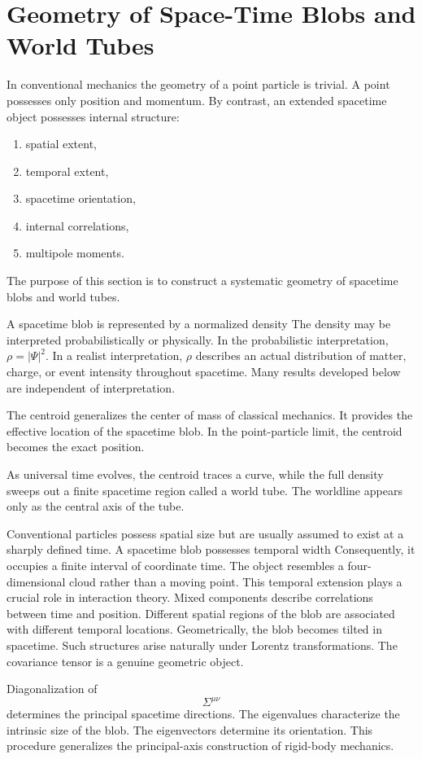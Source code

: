 \section{Geometry of Space-Time Blobs and World Tubes}
In conventional mechanics the geometry of a point particle is trivial. A
point possesses only position and momentum. By contrast, an extended
spacetime object possesses internal structure:
\begin{enumerate}
\item spatial extent,
\item temporal extent,
\item spacetime orientation,
\item internal correlations,
\item multipole moments.
\end{enumerate}
The purpose of this section is to construct a systematic geometry of 
spacetime blobs and world tubes.

A spacetime blob is represented by a normalized density
The density may be interpreted probabilistically or physically.
In the probabilistic interpretation, $\rho = |\Psi|^2.$
In a realist interpretation, $\rho $
describes an actual distribution of matter, charge, or event intensity
throughout spacetime.
Many results developed below are independent of interpretation.

The centroid generalizes the center of mass of classical mechanics.
It provides the effective location of the spacetime blob.
In the point-particle limit,
the centroid becomes the exact position.

As universal time evolves, the centroid traces a curve, while
the full density sweeps out a finite spacetime region
 called a world tube.
The worldline appears only as the central axis of the tube.

Conventional particles possess spatial size but are usually assumed 
to exist at a sharply defined time.
A spacetime blob possesses temporal width
Consequently, it occupies a finite interval of coordinate time.
The object resembles a four-dimensional cloud rather than a moving point.
This temporal extension plays a crucial role in interaction theory.
Mixed components  describe correlations between time and position.
Different spatial regions of the blob are associated with different 
temporal locations.
Geometrically, the blob becomes tilted in spacetime.
Such structures arise naturally under Lorentz transformations.
The covariance tensor is a genuine geometric object.

Diagonalization of
\begin{equation}
\Sigma^{\mu\nu}
\end{equation}
determines the principal spacetime directions.
The eigenvalues characterize the intrinsic size of the blob.
The eigenvectors determine its orientation.
This procedure generalizes the principal-axis construction of rigid-body 
mechanics.


